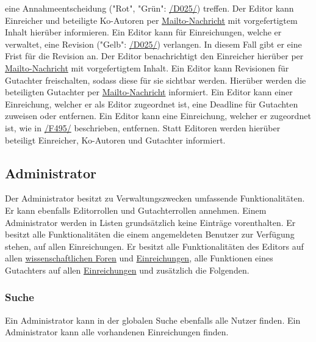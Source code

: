 \begin{description}
    eine Annahmeentscheidung ("Rot", "Grün": \hyperref[d025]{/D025/}) treffen.
    Der Editor kann Einreicher und beteiligte Ko-Autoren per \hyperref[glo:mailto]{Mailto-Nachricht} mit vorgefertigtem Inhalt
    hierüber informieren.
     Ein Editor kann für Einreichungen, welche er verwaltet,
    eine Revision ("Gelb": \hyperref[d025]{/D025/}) verlangen. In diesem Fall gibt er eine Frist für die Revision an.
    Der Editor benachrichtigt den Einreicher hierüber per \hyperref[glo:mailto]{Mailto-Nachricht} mit vorgefertigtem Inhalt.
     Ein Editor kann Revisionen für Gutachter freischalten, sodass diese für sie sichtbar werden.
    Hierüber werden die beteiligten Gutachter per \hyperref[glo:mailto]{Mailto-Nachricht} informiert.
     Ein Editor kann einer Einreichung, welcher er als Editor zugeordnet ist, eine Deadline für
    Gutachten zuweisen oder entfernen.
     Ein Editor kann eine Einreichung, welcher er zugeordnet ist, wie in
    \hyperref[funkt:495]{/F495/} beschrieben, entfernen.
    Statt Editoren werden hierüber beteiligt Einreicher, Ko-Autoren und Gutachter informiert.
\end{description}

\subsection{Administrator}
Der Administrator besitzt zu Verwaltungszwecken umfassende Funktionalitäten.
Er kann ebenfalls Editorrollen und Gutachterrollen annehmen.
Einem Administrator werden in Listen grundsätzlich keine Einträge vorenthalten.
Er besitzt alle Funktionalitäten die einem angemeldeten Benutzer zur Verfügung stehen, auf allen Einreichungen.
Er besitzt alle Funktionalitäten des Editors auf allen \hyperref[ed:wissFor]{wissenschaftlichen Foren} und \hyperref[ed:ein]{Einreichungen},
alle Funktionen eines Gutachters auf allen \hyperref[gut:ein]{Einreichungen}
und zusätzlich die Folgenden.

\subsubsection{Suche}
\begin{description}
     Ein Administrator kann in der globalen Suche ebenfalls alle Nutzer finden.
     Ein Administrator kann alle vorhandenen Einreichungen finden.
\end{description}


